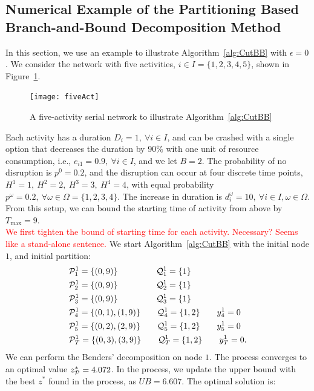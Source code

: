 \documentclass[11pt]{article}
\newcommand{\cQ}{{\cal Q}}
\newcommand{\noi}{\noindent}
\newcommand{\cP}{{\cal P}}
\newcommand{\tcr}{\textcolor{red}}
\begin{document}
	\subsection{Numerical Example of the Partitioning Based Branch-and-Bound Decomposition Method} \label{subsec:numeg}
	In this section, we use an example to illustrate Algorithm~\ref{alg:CutBB} with $\epsilon=0$. We consider the network with five activities, \(i \in I = \{1,2,3,4,5\}\), shown in Figure~\ref{fig:fiveAct}. 
	\begin{figure}[H]
		\centering
		\texttt{[image: fiveAct]}
		\caption{A five-activity serial network to illustrate Algorithm~\ref{alg:CutBB}}
		\label{fig:fiveAct}
	\end{figure}
	\noi Each activity has a duration \(D_i = 1,\ \forall i \in I\), and can be crashed with a single option that decreases the duration by 90\% with one unit of resource consumption, i.e., \(e_{i1} = 0.9,\ \forall i \in I\), and we let \(B = 2\). The probability of no disruption is \(p^0 = 0.2\), and the disruption can occur at four discrete time points, \(H^1 = 1,\ H^2 = 2,\ H^3 = 3,\ H^4 = 4\), with equal probability \(p^\omega = 0.2,\ \forall \omega \in \Omega = \{1,2,3,4\}\). The increase in duration is \(d_i^\omega = 10,\ \forall i \in I, \omega \in \Omega\). From this setup, we can bound the starting time of activity from above by \(T_{\max} = 9\). \\
	\newline
	\tcr{We first tighten the bound of starting time for each activity. Necessary? Seems like a stand-alone sentence.} We start Algorithm~\ref{alg:CutBB} with the initial node \(1\), and initial partition:
	\begin{align*}
	&\cP_1^1 = \{(0,9)\} \qquad \qquad \;\; \cQ_1^1 = \{1\}\\
	&\cP_2^1 = \{(0,9)\} \qquad \qquad \;\; \cQ_2^1 = \{1\}\\
	&\cP_3^1 = \{(0,9)\} \qquad \qquad \;\; \cQ_3^1 = \{1\}\\
	&\cP_4^1 = \{(0,1),(1,9)\} \qquad  \cQ_4^1 = \{1,2\} \qquad y_4^1 = 0\\
	&\cP_5^1 = \{(0,2),(2,9)\} \qquad  \cQ_5^1 = \{1,2\} \qquad y_5^1 = 0\\
	&\cP_T^1 = \{(0,3),(3,9)\} \qquad  \cQ_T^1 = \{1,2\} \qquad y_T^1 = 0.
	\end{align*}
	We can perform the Benders' decomposition on node \(1\). The process converges to an optimal value \(z^*_{\cP} = 4.072\). In the process, we update the upper bound with the best \(z^*\) found in the process, as \(UB = 6.607\). The optimal solution is:
\end{document}
